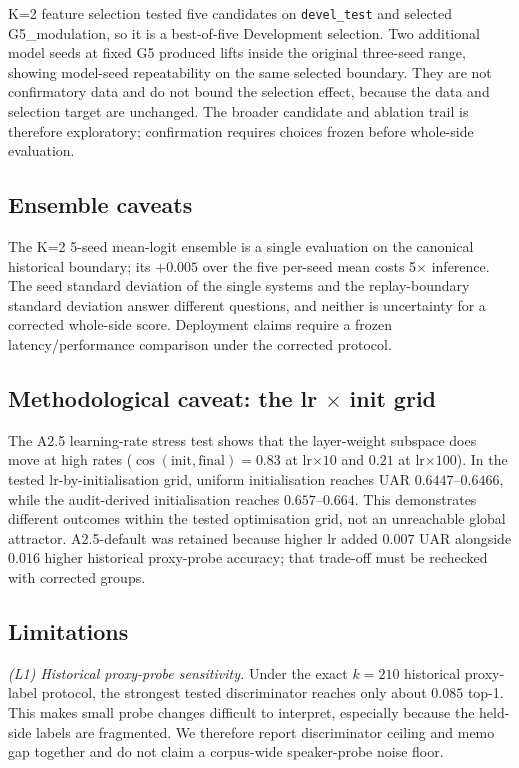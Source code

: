 K=2 feature selection tested five candidates on \texttt{devel\_test} and selected G5\_modulation, so it is a best-of-five Development selection. Two additional model seeds at fixed G5 produced lifts inside the original three-seed range, showing model-seed repeatability on the same selected boundary. They are not confirmatory data and do not bound the selection effect, because the data and selection target are unchanged. The broader candidate and ablation trail is therefore exploratory; confirmation requires choices frozen before whole-side evaluation.

\subsection{Ensemble caveats}

The K=2 5-seed mean-logit ensemble is a single evaluation on the canonical historical boundary; its $+0.005$ over the five per-seed mean costs 5$\times$ inference. The seed standard deviation of the single systems and the replay-boundary standard deviation answer different questions, and neither is uncertainty for a corrected whole-side score. Deployment claims require a frozen latency/performance comparison under the corrected protocol.

\subsection{Methodological caveat: the lr $\times$ init grid}

The A2.5 learning-rate stress test shows that the layer-weight subspace does move at high rates ($\cos(\text{init},\text{final})=0.83$ at lr$\times10$ and $0.21$ at lr$\times100$). In the tested lr-by-initialisation grid, uniform initialisation reaches UAR $0.6447$--$0.6466$, while the audit-derived initialisation reaches $0.657$--$0.664$. This demonstrates different outcomes within the tested optimisation grid, not an unreachable global attractor. A2.5-default was retained because higher lr added $0.007$ UAR alongside $0.016$ higher historical proxy-probe accuracy; that trade-off must be rechecked with corrected groups.

\subsection{Limitations}

\textit{(L1) Historical proxy-probe sensitivity.} Under the exact $k=210$ historical proxy-label protocol, the strongest tested discriminator reaches only about $0.085$ top-1. This makes small probe changes difficult to interpret, especially because the held-side labels are fragmented. We therefore report discriminator ceiling and memo gap together and do not claim a corpus-wide speaker-probe noise floor.

